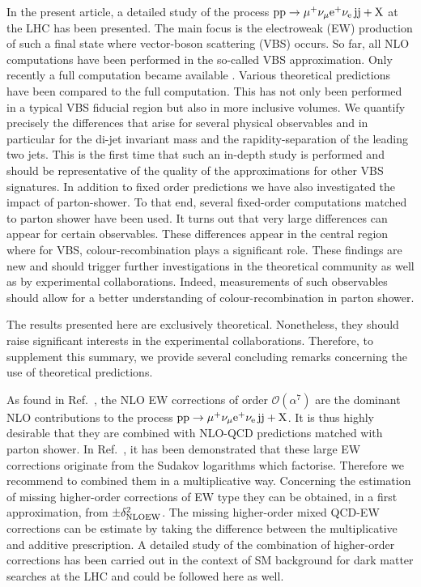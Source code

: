 In the present article, a detailed study of the process $\text{p}\text{p}\to\mu^+\nu_\mu{\rm e}^+\nu_{\rm e}\,\text{j}\text{j}+\mathrm{X}$ at the LHC has been presented.
The main focus is the electroweak (EW) production of such a final state where vector-boson scattering (VBS) occurs.
So far, all NLO computations have been performed in the so-called VBS approximation.
Only recently a full computation became available \cite{Biedermann:2017bss}.
Various theoretical predictions have been compared to the full computation.
This has not only been performed in a typical VBS fiducial region but also in more inclusive volumes.
We quantify precisely the differences that arise for several physical observables and in particular for the di-jet invariant mass and the rapidity-separation of the leading two jets.
This is the first time that such an in-depth study is performed and should be representative of the quality of the approximations for other VBS signatures.
In addition to fixed order predictions we have also investigated the impact of parton-shower.
To that end, several fixed-order computations matched to parton shower have been used.
It turns out that very large differences can appear for certain observables.
These differences appear in the central region where for VBS, colour-recombination plays a significant role.
These findings are new and should trigger further investigations in the theoretical community as well as by experimental collaborations.
Indeed, measurements of such observables should allow for a better understanding of colour-recombination in parton shower.

The results presented here are exclusively theoretical.
Nonetheless, they should raise significant interests in the experimental collaborations.
Therefore, to supplement this summary, we provide several concluding remarks concerning the use of theoretical predictions.

As found in Ref.~\cite{Biedermann:2017bss}, the NLO EW corrections of order $\mathcal{O}{\left(\alpha^{7}\right)}$ are the dominant NLO contributions to the process $\text{p}\text{p}\to\mu^+\nu_\mu{\rm e}^+\nu_{\rm e}\,\text{j}\text{j}+\mathrm{X}$.
It is thus highly desirable that they are combined with NLO-QCD predictions matched with parton shower.
In Ref.~\cite{Biedermann:2016yds}, it has been demonstrated that these large EW corrections originate from the Sudakov logarithms which factorise.
Therefore we recommend to combined them in a multiplicative way.
Concerning the estimation of missing higher-order corrections of EW type they can be obtained, in a first approximation, from $\pm \delta^2_{\rm NLO EW}$.
The missing higher-order mixed QCD-EW corrections can be estimate by taking the difference between the multiplicative and additive prescription.
A detailed study of the combination of higher-order corrections has been carried out in the context of SM background for dark matter searches at the LHC \cite{Lindert:2017olm} and could be followed here as well.


